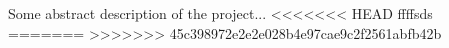 Some abstract description of the project... 
\lipsum[4-5]
<<<<<<< HEAD
ffffsds
=======
>>>>>>> 45c398972e2e2e028b4e97cae9c2f2561abfb42b
